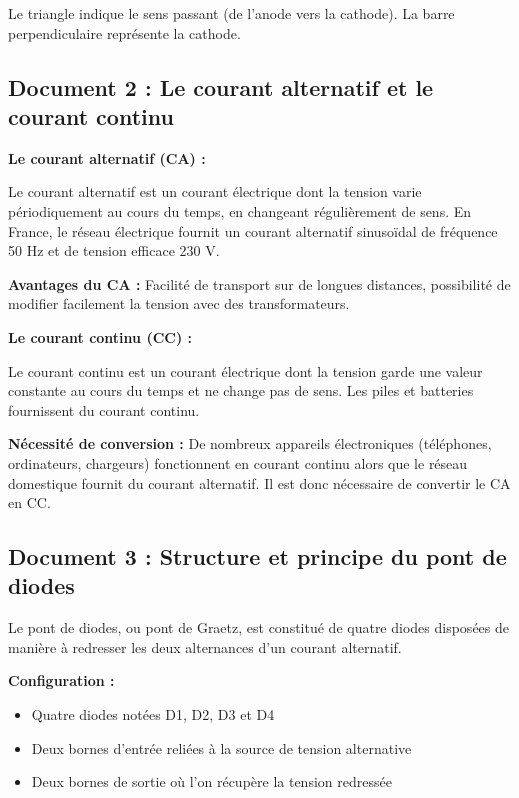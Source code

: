 \documentclass[11pt,a4paper]{article}
\begin{document}
Le triangle indique le sens passant (de l'anode vers la cathode). La barre perpendiculaire représente la cathode.

\subsection{Document 2 : Le courant alternatif et le courant continu}

\textbf{Le courant alternatif (CA) :}

Le courant alternatif est un courant électrique dont la tension varie périodiquement au cours du temps, en changeant régulièrement de sens. En France, le réseau électrique fournit un courant alternatif sinusoïdal de fréquence 50 Hz et de tension efficace 230 V.

\vspace{0.3cm}
\textbf{Avantages du CA :} Facilité de transport sur de longues distances, possibilité de modifier facilement la tension avec des transformateurs.

\vspace{0.3cm}
\textbf{Le courant continu (CC) :}

Le courant continu est un courant électrique dont la tension garde une valeur constante au cours du temps et ne change pas de sens. Les piles et batteries fournissent du courant continu.

\vspace{0.3cm}
\textbf{Nécessité de conversion :} De nombreux appareils électroniques (téléphones, ordinateurs, chargeurs) fonctionnent en courant continu alors que le réseau domestique fournit du courant alternatif. Il est donc nécessaire de convertir le CA en CC.

\subsection{Document 3 : Structure et principe du pont de diodes}

Le pont de diodes, ou pont de Graetz, est constitué de quatre diodes disposées de manière à redresser les deux alternances d'un courant alternatif.

\vspace{0.3cm}
\textbf{Configuration :}
\begin{itemize}
\item Quatre diodes notées D1, D2, D3 et D4
\item Deux bornes d'entrée reliées à la source de tension alternative
\item Deux bornes de sortie où l'on récupère la tension redressée
\end{itemize}
\end{document}
